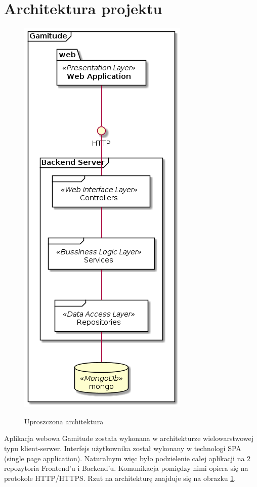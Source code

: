 \documentclass[a4paper,11pt]{report}
\begin{document}
\section {Architektura projektu}
\begin{figure}[H]
	\centering
	\includegraphics[scale=0.4]{gamitude_overview}\\
	\caption{Uproszczona architektura}
	\label{fig:overwiewarch}
\end{figure}
Aplikacja webowa Gamitude została wykonana w architekturze wielowarstwowej typu klient-serwer.
Interfejs użytkownika został wykonany w technologi SPA (single page application).
Naturalnym więc było podzielenie całej aplikacji na 2 repozytoria Frontend'u i Backend'u.
Komunikacja pomiędzy nimi opiera się na protokole HTTP/HTTPS. Rzut na architekturę znajduje się na obrazku \ref{fig:overwiewarch}.\\
\end{document}
